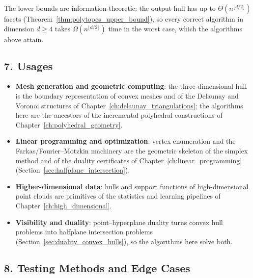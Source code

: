 The lower bounds are information-theoretic: the output hull has up to
$\Theta(n^{\lfloor d/2 \rfloor})$ facets
(Theorem~\ref{thm:polytopes_upper_bound}), so every correct algorithm in
dimension $d \ge 4$ takes $\Omega(n^{\lfloor d/2 \rfloor})$ time in the
worst case, which the algorithms above attain.

\subsection{7. Usages}

\begin{itemize}
\item \textbf{Mesh generation and geometric computing}: the three-dimensional
  hull is the boundary representation of convex meshes and of the Delaunay
  and Voronoi structures of Chapter~\ref{ch:delaunay_triangulations}; the
  algorithms here are the ancestors of the incremental polyhedral
  constructions of Chapter~\ref{ch:polyhedral_geometry}.
\item \textbf{Linear programming and optimization}: vertex enumeration and
  the Farkas/Fourier--Motzkin machinery are the geometric skeleton of the
  simplex method and of the duality certificates of
  Chapter~\ref{ch:linear_programming} (Section~\ref{sec:halfplane_intersection}).
\item \textbf{Higher-dimensional data}: hulls and support functions of
  high-dimensional point clouds are primitives of the statistics and
  learning pipelines of Chapter~\ref{ch:high_dimensional}.
\item \textbf{Visibility and duality}: point--hyperplane duality turns
  convex hull problems into halfplane intersection problems
  (Section~\ref{sec:duality_convex_hulls}), so the algorithms here solve
  both.
\end{itemize}

\subsection{8. Testing Methods and Edge Cases}

